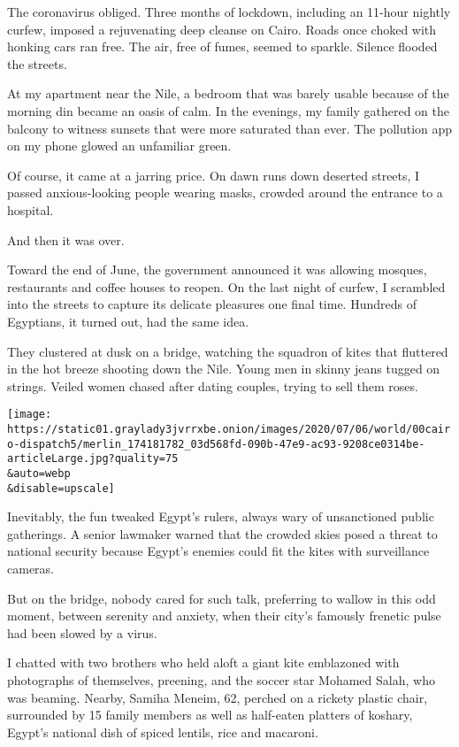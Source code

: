 The coronavirus obliged. Three months of lockdown, including an 11-hour
nightly curfew, imposed a rejuvenating deep cleanse on Cairo. Roads once
choked with honking cars ran free. The air, free of fumes, seemed to
sparkle. Silence flooded the streets.

At my apartment near the Nile, a bedroom that was barely usable because
of the morning din became an oasis of calm. In the evenings, my family
gathered on the balcony to witness sunsets that were more saturated than
ever. The pollution app on my phone glowed an unfamiliar green.

Of course, it came at a jarring price. On dawn runs down deserted
streets, I passed anxious-looking people wearing masks, crowded around
the entrance to a hospital.

And then it was over.

Toward the end of June, the government announced it was allowing
mosques, restaurants and coffee houses to reopen. On the last night of
curfew, I scrambled into the streets to capture its delicate pleasures
one final time. Hundreds of Egyptians, it turned out, had the same idea.

They clustered at dusk on a bridge, watching the squadron of kites that
fluttered in the hot breeze shooting down the Nile. Young men in skinny
jeans tugged on strings. Veiled women chased after dating couples,
trying to sell them roses.

\texttt{[image: https://static01.graylady3jvrrxbe.onion/images/2020/07/06/world/00cairo-dispatch5/merlin\_174181782\_03d568fd-090b-47e9-ac93-9208ce0314be-articleLarge.jpg?quality=75\\\&auto=webp\\\&disable=upscale]}

Inevitably, the fun tweaked Egypt's rulers, always wary of unsanctioned
public gatherings. A senior lawmaker warned that the crowded skies posed
a threat to national security because Egypt's enemies could fit the
kites with surveillance cameras.

But on the bridge, nobody cared for such talk, preferring to wallow in
this odd moment, between serenity and anxiety, when their city's
famously frenetic pulse had been slowed by a virus.

I chatted with two brothers who held aloft a giant kite emblazoned with
photographs of themselves, preening, and the soccer star Mohamed Salah,
who was beaming. Nearby, Samiha Meneim, 62, perched on a rickety plastic
chair, surrounded by 15 family members as well as half-eaten platters of
koshary, Egypt's national dish of spiced lentils, rice and macaroni.

